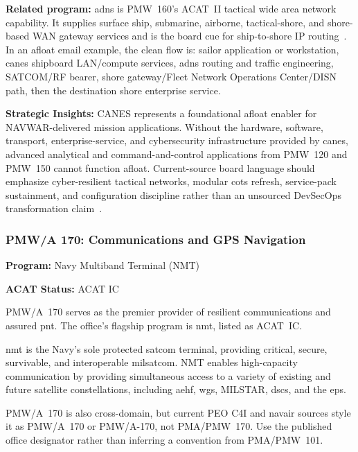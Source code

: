 \documentclass[../main.tex]{subfiles}
\begin{document}
\textbf{Related program:} \ac{adns} is PMW~160's ACAT~II tactical wide area network capability. It supplies surface ship, submarine, airborne, tactical-shore, and shore-based WAN gateway services and is the board cue for ship-to-shore IP routing~\autocite{PEOC4I-PMW160-tearsheet-2025}. In an afloat email example, the clean flow is: sailor application or workstation, \ac{canes} shipboard LAN/compute services, \ac{adns} routing and traffic engineering, SATCOM/RF bearer, shore gateway/Fleet Network Operations Center/DISN path, then the destination shore enterprise service.

\textbf{Strategic Insights:} CANES represents a foundational afloat enabler for NAVWAR-delivered mission applications. Without the hardware, software, transport, enterprise-service, and cybersecurity infrastructure provided by \ac{canes}, advanced analytical and command-and-control applications from PMW~120 and PMW~150 cannot function afloat. Current-source board language should emphasize cyber-resilient tactical networks, modular \ac{cots} refresh, service-pack sustainment, and configuration discipline rather than an unsourced DevSecOps transformation claim~\autocite{PEOC4I-PMW160-tearsheet-2025}.

\subsubsection{PMW/A 170: Communications and GPS Navigation}
\label{ssubsec:pmw170}

\textbf{Program:} Navy Multiband Terminal (NMT)

\textbf{ACAT Status:} ACAT IC~\autocite{PEOC4I-PMW170-tearsheet-2025}

PMW/A~170 serves as the premier provider of resilient communications and assured \ac{pnt}. The office's flagship program is \ac{nmt}, listed as ACAT~IC.

\ac{nmt} is the Navy's sole protected \ac{satcom} terminal, providing critical, secure, survivable, and interoperable \ac{milsatcom}. NMT enables high-capacity communication by providing simultaneous access to a variety of existing and future satellite constellations, including \ac{aehf}, \ac{wgs}, MILSTAR, \ac{dscs}, and the \ac{eps}.

PMW/A~170 is also cross-domain, but current PEO C4I and \ac{navair} sources style it as PMW/A~170 or PMW/A-170, not PMA/PMW~170. Use the published office designator rather than inferring a convention from PMA/PMW~101\autocite{PEOC4I-PMW170-tearsheet-2025,NAVAIR-PMWA170}.
\end{document}
